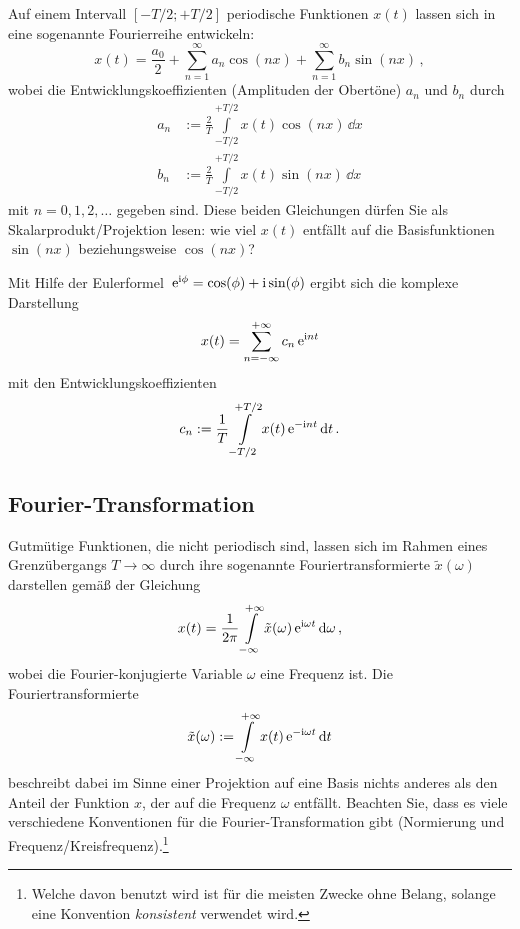 \documentclass[paper=a4, fontsize=11.0pt, abstractoff, DIV12]{scrartcl}
\begin{document}
Auf einem Intervall $[-T/2; +T/2]$ periodische Funktionen $x(t)$
lassen sich in eine sogenannte Fourierreihe entwickeln:
\begin{equation}
x(t) = \frac{a_0}{2}+\sum\limits_{n=1}^{\infty}a_n\cos(nx) + \sum\limits_{n=1}^{\infty}b_n\sin(nx)\,,
\end{equation}
wobei die Entwicklungskoeffizienten (Amplituden der \glqq Obertöne\grqq)
$a_n$ und $b_n$ durch
\begin{align}
a_n &:= \frac{2}{T}\int\limits_{-T/2}^{+T/2}x(t)\cos(nx)\,\dd x\\
b_n &:= \frac{2}{T}\int\limits_{-T/2}^{+T/2}x(t)\sin(nx)\,\dd x
\end{align}
mit $n=0,1,2,\dots$ gegeben sind. Diese beiden Gleichungen dürfen Sie als
Skalarprodukt/Projektion lesen: \glqq wie viel $x(t)$ entfällt auf die
Basisfunktionen $\sin(nx)$ beziehungsweise $\cos(nx)$?\grqq

Mit Hilfe der Eulerformel $\,{\mathrm{e}}^{\mathrm{i}\phi}=\cos(\phi)+\mathrm{i}\sin(\phi)$ ergibt
sich die komplexe Darstellung
\begin{equation}
x(t) = \sum\limits_{n=-\infty}^{+\infty}c_n\,{\mathrm{e}}^{\mathrm{i} n t}
\end{equation}
mit den Entwicklungskoeffizienten
\begin{equation}
c_n := \frac{1}{T}\int\limits_{-T/2}^{+T/2}x(t)\,{\mathrm{e}}^{-\mathrm{i} n t}\,\mathrm{d} t\,.
\end{equation}

\subsection{Fourier-Transformation}

Gutmütige Funktionen, die nicht periodisch sind, lassen sich im Rahmen eines
Grenzübergangs $T\to\infty$ durch ihre sogenannte Fouriertransformierte
$\tilde x(\omega)$ darstellen gemäß der Gleichung
\begin{equation}
x(t) = \frac{1}{2\pi}\int\limits_{-\infty}^{+\infty} \tilde x(\omega) \,{\mathrm{e}}^{\mathrm{i} \omega t}\,\mathrm{d}\omega\,,
\label{eq:IFT}
\end{equation}
wobei die Fourier-konjugierte Variable $\omega$ eine Frequenz ist. Die
Fouriertransformierte
\begin{equation}
\tilde x(\omega) := \int\limits_{-\infty}^{+\infty}x(t) \,{\mathrm{e}}^{-\mathrm{i} \omega t}\,\mathrm{d} t
\label{eq:FT}
\end{equation}
beschreibt dabei im Sinne einer Projektion auf eine Basis nichts anderes als
den Anteil der Funktion $x$, der auf die Frequenz $\omega$ entfällt.
Beachten Sie, dass es viele verschiedene Konventionen für die
Fourier-Transformation gibt (Normierung und Frequenz/Kreisfrequenz).\footnote
{Welche davon benutzt wird ist für die meisten Zwecke ohne Belang, solange
eine Konvention \emph{konsistent} verwendet wird.}
\end{document}
